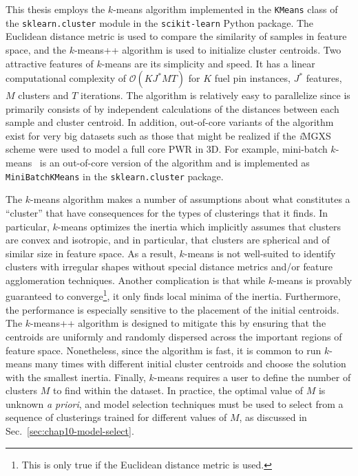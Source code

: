 This thesis employs the $k$-means algorithm implemented in the \texttt{KMeans} class of the \texttt{sklearn.cluster} module in the \texttt{scikit-learn} Python package. The Euclidean distance metric is used to compare the similarity of samples in feature space, and the $k$-means++ algorithm is used to initialize cluster centroids. Two attractive features of $k$-means are its simplicity and speed. It has a linear computational complexity of $\mathcal{O}(KJ^{*}MT)$ for $K$ fuel pin instances, $J^{*}$ features, $M$ clusters and $T$ iterations. The algorithm is relatively easy to parallelize since is primarily consists of by independent calculations of the distances between each sample and cluster centroid. In addition, out-of-core variants of the algorithm exist for very big datasets such as those that might be realized if the \textit{i}\ac{MGXS} scheme were used to model a full core \ac{PWR} in 3D. For example, mini-batch $k$-means~\cite{sculley2010minibatchkmeans} is an out-of-core version of the algorithm and is implemented as \texttt{MiniBatchKMeans} in the \texttt{sklearn.cluster} package.

The $k$-means algorithm makes a number of assumptions about what constitutes a ``cluster'' that have consequences for the types of clusterings that it finds. In particular, $k$-means optimizes the inertia which implicitly assumes that clusters are convex and isotropic, and in particular, that clusters are spherical and of similar size in feature space. As a result, $k$-means is not well-suited to identify clusters with irregular shapes without special distance metrics and/or feature agglomeration techniques. Another complication is that while $k$-means is provably guaranteed to converge\footnote{This is only true if the Euclidean distance metric is used.}, it only finds local minima of the inertia. Furthermore, the performance is especially sensitive to the placement of the initial centroids. The $k$-means++ algorithm is designed to mitigate this by ensuring that the centroids are uniformly and randomly dispersed across the important regions of feature space. Nonetheless, since the algorithm is fast, it is common to run $k$-means many times with different initial cluster centroids and choose the solution with the smallest inertia. Finally, $k$-means requires a user to define the number of clusters $M$ to find within the dataset. In practice, the optimal value of $M$ is unknown \textit{a priori}, and model selection techniques must be used to select from a sequence of clusterings trained for different values of $M$, as discussed in Sec.~\ref{sec:chap10-model-select}.

